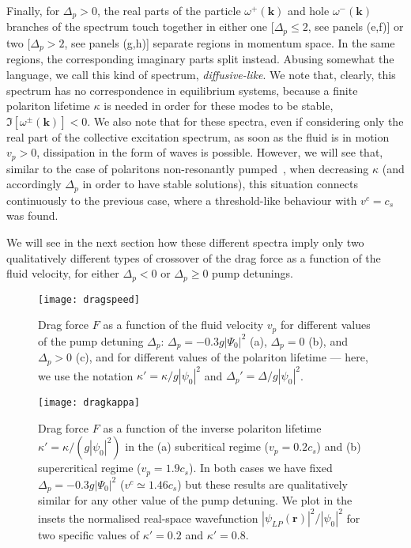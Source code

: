 Finally, for $\Delta_p>0$, the real parts of the particle $\omega^+
(\bm{k})$ and hole $\omega^- (\bm{k})$ branches of the spectrum
touch together in either one [$\Delta_p \le 2$, see panels (e,f)] or
two [$\Delta_p > 2$, see panels (g,h)] separate regions in momentum
space. In the same regions, the corresponding imaginary parts 
split instead. Abusing somewhat the language, we call this kind of
spectrum, \emph{diffusive-like}. We note that, clearly, this spectrum
has no correspondence in equilibrium systems, because a finite
polariton lifetime $\kappa$ is needed in order for these modes to be
stable, $\Im [ \omega^{\pm} (\bm{k}) ]<0$. We also note that for
these spectra, even if considering only the real part of the
collective excitation spectrum, as soon as the fluid is in motion
$v_p>0$, dissipation in the form of waves is possible. However, we
will see that, similar to the case of polaritons non-resonantly
pumped~\cite{Wouters_2010}, when decreasing $\kappa$ (and accordingly
$\Delta_p$ in order to have stable solutions), this situation connects
continuously to the previous case, where a threshold-like behaviour
with $v^c = c_s$ was found.


We will see in the next section how these different spectra imply only
two qualitatively different types of crossover of the drag force as a
function of the fluid velocity, for either $\Delta_p<0$ or $\Delta_p
\ge 0$ pump detunings.

%
\begin{figure}[tb]\centering
\texttt{[image: dragspeed]} %
\caption{
%
Drag force $F$ as a function of the fluid velocity
$v_p$ for different values of the pump detuning $\Delta_p$:
$\Delta_p=-0.3g|\Psi_0|^2$ (a), $\Delta_p=0$ (b), and $\Delta_p>0$
(c), and for different values of the polariton lifetime --- here, we
use the notation $\kappa' = \kappa/g|\psi_0|^2$ and $\Delta_p' =
\Delta/g|\psi_0|^2$.
%
}\label{fig:dragv}
\end{figure}
%
%
\begin{figure}[tb]\centering
\texttt{[image: dragkappa]} %
\caption{
%
Drag force $F$ as a function of the inverse polariton
lifetime $\kappa'=\kappa/(g |\psi_0|^2)$ in the (a) subcritical regime
($v_p=0.2 c_s$) and (b) supercritical regime ($v_p=1.9 c_s$). In both
cases we have fixed $\Delta_p=-0.3g|\Psi_0|^2$ ($v^c \simeq 1.46 c_s$)
but these results are qualitatively similar for any other value of the
pump detuning. We plot in the insets the normalised real-space
wavefunction $|\psi_{LP}(\bm{r})|^2/|\psi_0|^2$ for two specific
values of $\kappa'=0.2$ and $\kappa'=0.8$.
%
}\label{fig:dragk}
\end{figure}
%


